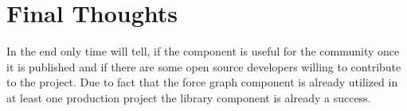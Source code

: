 \section{Final Thoughts}

In the end only time will tell, if the component is useful for the community once it is published and if there are some open source developers willing to contribute to the project. Due to fact that the force graph component is already utilized in at least one production project the library component is already a success.